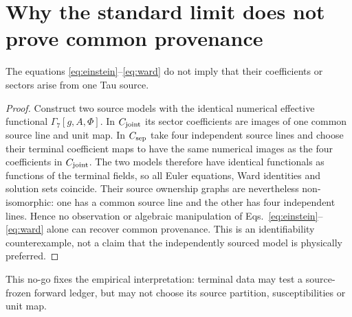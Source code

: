 \section{Why the standard limit does not prove common provenance}

\begin{proposition}
The equations \eqref{eq:einstein}--\eqref{eq:ward} do not imply that their
coefficients or sectors arise from one Tau source.
\end{proposition}
\begin{proof}
Construct two source models with the identical numerical effective functional
$\Gamma_7[g,A,\Phi]$.  In $C_{\rm joint}$ its sector coefficients are images
of one common source line and unit map.  In $C_{\rm sep}$ take four independent
source lines and choose their terminal coefficient maps to have the same
numerical images as the four coefficients in $C_{\rm joint}$.  The two models
therefore have identical functionals as functions of the terminal fields, so
all Euler equations, Ward identities and solution sets coincide.  Their
source ownership graphs are nevertheless non-isomorphic: one has a common
source line and the other has four independent lines.  Hence no observation
or algebraic manipulation of Eqs.~\eqref{eq:einstein}--\eqref{eq:ward} alone
can recover common provenance.  This is an identifiability counterexample,
not a claim that the independently sourced model is physically preferred.
\end{proof}

This no-go fixes the empirical interpretation: terminal data may test a
source-frozen forward ledger, but may not choose its source partition,
susceptibilities or unit map.

